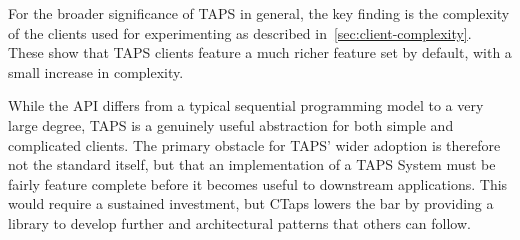 For the broader significance of TAPS in general, the key finding
is the complexity of the clients used for experimenting as
described in~\cref{sec:client-complexity}. These show that
TAPS clients feature a much richer feature set by default, with
a small increase in complexity.

While the API differs from a typical sequential programming model to a very large degree,
TAPS is a genuinely useful abstraction for both simple and complicated
clients. The primary obstacle for TAPS' wider adoption is therefore
not the standard itself, but that an implementation of a TAPS System must be
fairly feature complete before it becomes useful to downstream
applications. This would require a sustained investment, but
CTaps lowers the bar by providing a library to develop
further and architectural patterns that others can follow.
